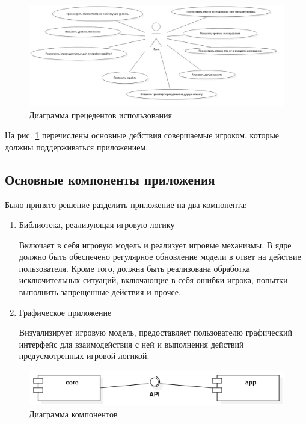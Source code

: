\begin{figure}[H]
	\begin{center}
		\includegraphics[scale=0.35]{../../uml/UseCaseDiagram1.png}
		\caption{Диаграмма прецедентов использования}
		\label{pic:use_case}
	\end{center}
\end{figure}

На рис. \ref{pic:use_case} перечислены основные действия совершаемые игроком, которые должны поддерживаться приложением.

\subsection{Основные компоненты приложения}

Было принято решение разделить приложение на два компонента:

\begin{enumerate}
	\item Библиотека, реализующая игровую логику
		
	 Включает в себя игровую модель и реализует игровые механизмы. В ядре должно быть обеспечено регулярное обновление модели в ответ на действие пользователя. Кроме того, должна быть реализована обработка исключительных ситуаций, включающие в себя ошибки игрока, попытки выполнить запрещенные действия и прочее. 	 
	
	\item Графическое приложение 

	Визуализирует игровую модель, предоставляет пользователю графический интерфейс для взаимодействия с ней и выполнения действий предусмотренных игровой логикой.
\end{enumerate}

\begin{figure}[H]
	\begin{center}
		\includegraphics[scale=0.7]{../../uml/ComponentDiagram1.png}
		\caption{Диаграмма компонентов}
		\label{pic:components}
	\end{center}
\end{figure}

